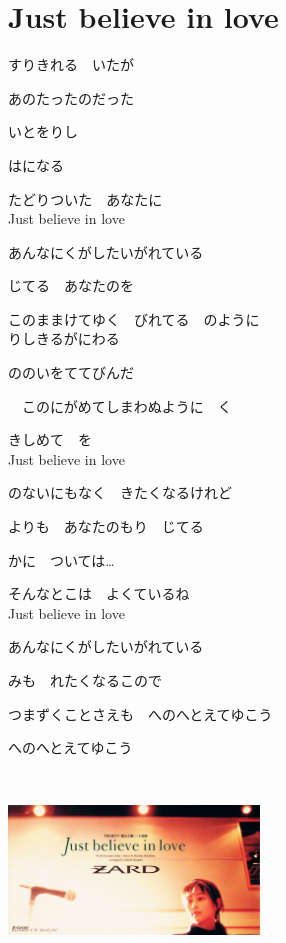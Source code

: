 \section{ Just believe in love}
\large{

すりきれる　いたが

あのたったのだった

いとをりし

はになる

たどりついた　あなたに
\\

Just believe in love

あんなにくがしたいがれている

じてる　あなたのを

このままけてゆく　びれてる　のように
\\

りしきるがにわる

ののいをててびんだ

　このにがめてしまわぬように　く

きしめて　を
\\

Just believe in love

のないにもなく　きたくなるけれど

よりも　あなたのもり　じてる

かに　ついては…

そんなとこは　よくているね
\\

Just believe in love

あんなにくがしたいがれている

みも　れたくなるこので

つまずくことさえも　へのへとえてゆこう

へのへとえてゆこう

}
{ \ }

\includegraphics[width=0.5\textwidth]{S14.jpg}
